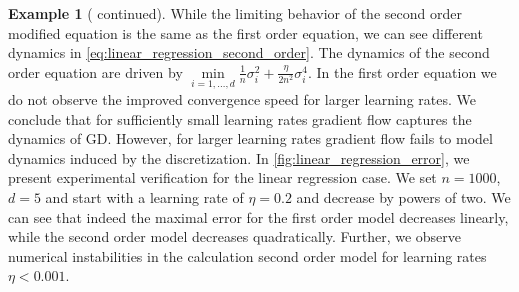 \documentclass[12pt]{article}
\theoremstyle{definition}
\newtheorem{example}[example]{Example}
\numberwithin{equation}{section}
\newcommand{\T}{\mathsf{T}}
\newcommand{\norm}[1]{\lVert{#1}\rVert_2}
\newcommand{\defeq}{\vcentcolon=}
\DeclareMathOperator{\diag}{diag}
\begin{document}
\begin{example}[ continued]
  While the limiting behavior of the second order modified equation is the same as the first order equation, we can see different dynamics in \eqref{eq:linear_regression_second_order}. The dynamics of the second order equation are driven by $\min\limits_{i=1,\dots,d}\frac{1}{n}\sigma_i^2 + \frac{\eta}{2n^2}\sigma_i^4$. In the first order equation we do not observe the improved convergence speed for larger learning rates.
  We conclude that for sufficiently small learning rates gradient flow captures the dynamics of GD. However, for larger learning rates gradient flow fails to model dynamics induced by the discretization. In \autoref{fig:linear_regression_error}, we present experimental verification for the linear regression case. We set $n = 1000$, $d = 5$ and start with a learning rate of $\eta = 0.2$ and decrease by powers of two. We can see that indeed the maximal error for the first order model decreases linearly, while the second order model decreases quadratically. Further, we observe numerical instabilities in the calculation second order model for learning rates $\eta < 0.001$.


\end{example}
\end{document}
